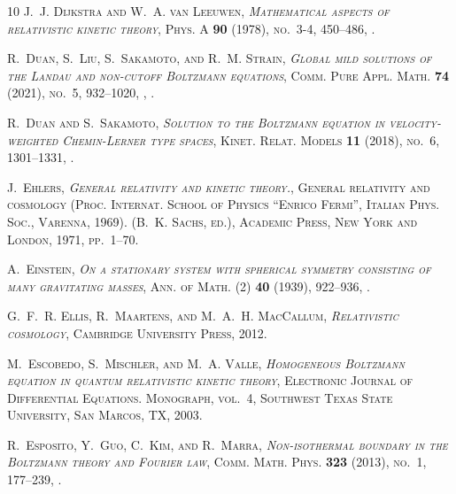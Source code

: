 \documentclass[reqno]{amsart}
\theoremstyle{definition}
\numberwithin{equation}{section}
\numberwithin{theorem}{section}
\begin{document}
\begin{thebibliography}{10}
\bgroup\scshape{}J.~J. Dijkstra\egroup{} and \bgroup\scshape{}W.~A. van Leeuwen\egroup{}, \emph{Mathematical aspects of relativistic kinetic theory}, Phys. A \textbf{90} (1978), no.~3-4, 450--486, .

\bgroup\scshape{}R.~Duan\egroup{}, \bgroup\scshape{}S.~Liu\egroup{}, \bgroup\scshape{}S.~Sakamoto\egroup{}, and \bgroup\scshape{}R.~M. Strain\egroup{}, \emph{Global mild solutions of the {L}andau and non-cutoff {B}oltzmann equations}, Comm. Pure Appl. Math. \textbf{74} (2021), no.~5, 932--1020, , .

\bgroup\scshape{}R.~Duan\egroup{} and \bgroup\scshape{}S.~Sakamoto\egroup{}, \emph{Solution to the {B}oltzmann equation in velocity-weighted {C}hemin-{L}erner type spaces}, Kinet. Relat. Models \textbf{11} (2018), no.~6, 1301--1331, .

\bgroup\scshape{}J.~Ehlers\egroup{}, \emph{General relativity and kinetic theory.}, General relativity and cosmology (Proc. Internat. School of Physics ``Enrico Fermi'', Italian Phys. Soc., Varenna, 1969). (\bgroup\scshape{}B.~K. Sachs\egroup{}, ed.), Academic Press, New York and London, 1971, pp.~1--70.

\bgroup\scshape{}A.~Einstein\egroup{}, \emph{On a stationary system with spherical symmetry consisting of many gravitating masses}, Ann. of Math. (2) \textbf{40} (1939), 922--936, .

\bgroup\scshape{}G.~F.~R. Ellis\egroup{}, \bgroup\scshape{}R.~Maartens\egroup{}, and \bgroup\scshape{}M.~A.~H. MacCallum\egroup{}, \emph{Relativistic cosmology}, Cambridge University Press, 2012.

\bgroup\scshape{}M.~Escobedo\egroup{}, \bgroup\scshape{}S.~Mischler\egroup{}, and \bgroup\scshape{}M.~A. Valle\egroup{}, \emph{Homogeneous {B}oltzmann equation in quantum relativistic kinetic theory}, Electronic Journal of Differential Equations. Monograph, vol.~4, Southwest Texas State University, San Marcos, TX, 2003.

\bgroup\scshape{}R.~Esposito\egroup{}, \bgroup\scshape{}Y.~Guo\egroup{}, \bgroup\scshape{}C.~Kim\egroup{}, and \bgroup\scshape{}R.~Marra\egroup{}, \emph{Non-isothermal boundary in the {B}oltzmann theory and {F}ourier law}, Comm. Math. Phys. \textbf{323} (2013), no.~1, 177--239, .


\end{thebibliography}
\end{document}
